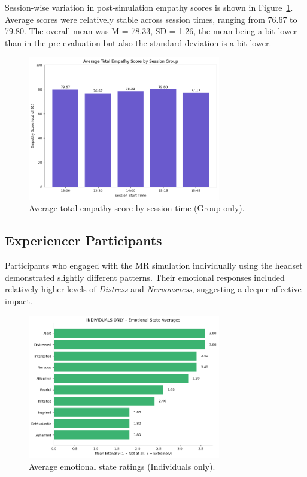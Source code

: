 \vspace{1em}

Session-wise variation in post-simulation empathy scores is shown in Figure~\ref{fig:empathy_group_sessions}. Average scores were relatively stable across session times, ranging from 76.67 to 79.80. The overall mean was M = 78.33, SD = 1.26, the mean being a bit lower than in the pre-evaluation but also the standard deviation is a bit lower. 

\begin{figure}[htbp]
    \centering
    \includegraphics[width=0.75\textwidth]{../../Figures/post-session-grp-empathy.png}
    \caption{Average total empathy score by session time (Group only).}
    \label{fig:empathy_group_sessions}
\end{figure}


\subsection{Experiencer Participants}

Participants who engaged with the MR simulation individually using the headset demonstrated slightly different patterns. Their emotional responses included relatively higher levels of \textit{Distress} and \textit{Nervousness}, suggesting a deeper affective impact.

\begin{figure}[H]
    \centering
    \includegraphics[width=0.75\textwidth]{../../Figures/emotional-post-indiv.png}
    \caption{Average emotional state ratings (Individuals only).}
    \label{fig:emotional_post_indiv}
\end{figure}

